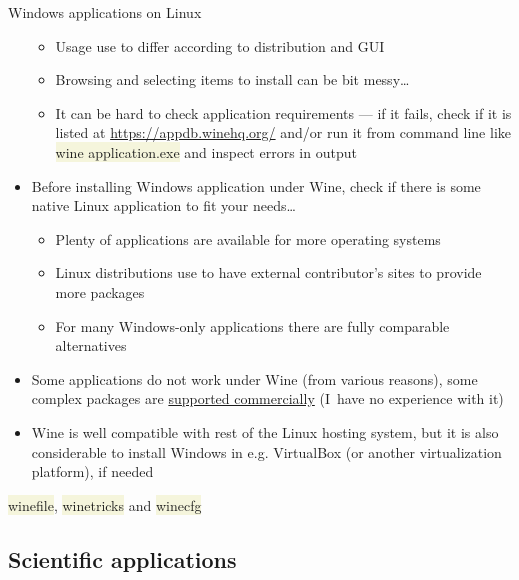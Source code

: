 \documentclass[compress, xelatex, 11pt, xcolor=svgnames, aspectratio=169,
	hyperref={
		bookmarks=true,
		unicode=true,
		colorlinks=true,
		pdftitle={Linux, command line and MetaCentrum},
		plainpages=false,
		pdfauthor={Vojtech Zeisek},
		pdfsubject={Course about use of Linux command line, writing shell scripts and using MetaCentrum of CESNET},
		pdfcreator={XeLaTeX},
		pdfkeywords={Linux, GNU, BASH, shell, command line, MetaCentrum},
		linkcolor=DarkRed, %
		anchorcolor=DarkBlue, %
		citecolor=Indigo, %
		filecolor=NavyBlue, %
		menucolor=DarkMagenta, %
		urlcolor=DarkBlue, %
		},
	url={hyphens, lowtilde} %
	]{beamer}
\renewcommand{\texttt}[1]{\colorbox{Beige}{{\ttfamily #1}}}
\begin{document}
\begin{frame}[allowframebreaks]{Windows applications on Linux}
\begin{itemize}
		\begin{itemize}
			\item Usage use to differ according to distribution and GUI
			\item Browsing and selecting items to install can be bit messy\ldots
			\item It can be hard to check application requirements --- if it fails, check if it is listed at \url{https://appdb.winehq.org/} and/or run it from command line like \texttt{wine application.exe} and inspect errors in output
		\end{itemize}
		\item Before installing Windows application under Wine, check if there is some native Linux application to fit your needs\ldots
		\begin{itemize}
			\item Plenty of applications are available for more operating systems
			\item Linux distributions use to have external contributor's sites to provide more packages
			\item For many Windows-only applications there are fully comparable alternatives
		\end{itemize}
		\item Some applications do not work under Wine (from various reasons), some complex packages are \href{https://www.codeweavers.com/}{supported commercially} (I~have no experience with it)
		\item Wine is well compatible with rest of the Linux hosting system, but it is also considerable to install Windows in e.g. VirtualBox (or another virtualization platform), if needed
	\end{itemize}
	\begin{center}
		\texttt{[image: wine.png]}
	\end{center}
	\begin{flushright}
		\texttt{winefile}, \texttt{winetricks} and \texttt{winecfg}
	\end{flushright}
\end{frame}

\subsection{Scientific applications}
\end{document}
